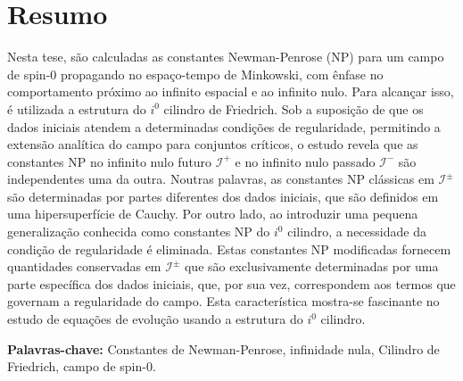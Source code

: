 
\section*{Resumo}


Nesta tese, são calculadas as constantes Newman-Penrose (NP) para um campo de spin-0 propagando no espaço-tempo de Minkowski, com ênfase no comportamento próximo ao infinito espacial e ao infinito nulo. Para alcançar isso, é utilizada a estrutura do $i^0$ cilindro de Friedrich. Sob a suposição de que os dados iniciais atendem a determinadas condições de regularidade, permitindo a extensão analítica do campo para conjuntos críticos, o estudo revela que as constantes NP no infinito nulo futuro $\mathscr{I}^{+}$ e no infinito nulo passado $\mathscr{I}^{-}$ são independentes uma da outra. Noutras palavras, as constantes NP clássicas em $\mathscr{I}^{\pm}$ são determinadas por partes diferentes dos dados iniciais, que são definidos em uma hipersuperfície de Cauchy.
Por outro lado, ao introduzir uma pequena generalização conhecida como constantes NP do $i^0$ cilindro, a necessidade da condição de regularidade é eliminada. Estas constantes NP modificadas fornecem quantidades conservadas em $\mathscr{I}^{\pm}$ que são exclusivamente determinadas por uma parte específica dos dados iniciais, que, por sua vez, correspondem aos termos que governam a regularidade do campo. Esta característica mostra-se fascinante no estudo de equações de evolução usando a estrutura do $i^0$ cilindro.

\vfill

\textbf{\Large Palavras-chave:} Constantes de Newman-Penrose, infinidade nula, Cilindro de Friedrich, campo de spin-0.

